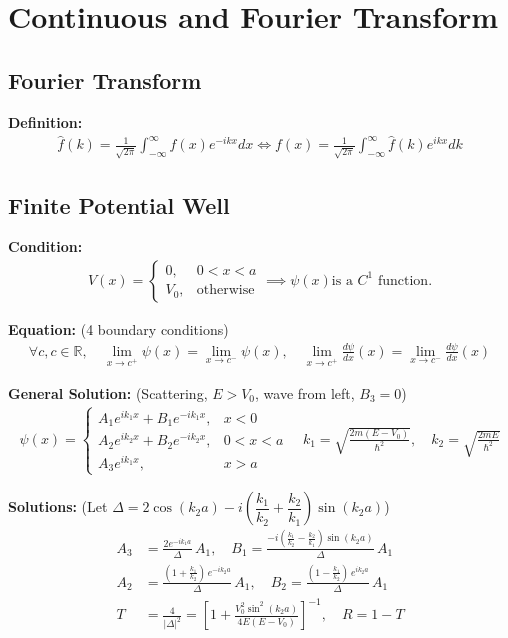 \documentclass[12pt]{article}
\begin{document}
\section{Continuous and Fourier Transform }

\subsection{Fourier Transform } 

\textbf{Definition: }
\begin{align}
    \hat{f}(k) = \frac{1}{\sqrt{2\pi}} \int_{-\infty}^{\infty} f(x) e^{-ikx} dx \Longleftrightarrow f(x) = \frac{1}{\sqrt{2\pi}} \int_{-\infty}^{\infty} \hat{f}(k) e^{ikx} dk 
\end{align} 

\subsection{Finite Potential Well } 

\textbf{Condition: }
\begin{align}
    V(x) = \begin{cases}
    0, & 0 < x < a \\
    V_0, & \text{otherwise}
\end{cases} \implies \psi(x) \text{is a $C^1$ function.} 
\end{align} 

\textbf{Equation: } (4 boundary conditions)
\begin{align}
    \forall c, c \in \mathbb{R}, \quad \lim_{x \to c^+} \psi(x) = \lim_{x \to c^-} \psi(x), \quad \lim_{x \to c^+} \frac{d\psi}{dx}(x) = \lim_{x \to c^-} \frac{d\psi}{dx}(x) 
\end{align} 

\textbf{General Solution: } (Scattering, $E > V_0$, wave from left, $B_3 = 0$)
\begin{align}
    \psi(x) = \begin{cases}
    A_1 e^{ik_1 x} + B_1 e^{-ik_1 x}, & x < 0 \\
    A_2 e^{ik_2 x} + B_2 e^{-ik_2 x}, & 0 < x < a \\
    A_3 e^{ik_1 x}, & x > a
\end{cases} \quad k_1 = \sqrt{\frac{2m(E-V_0)}{\hbar^2}}, \quad k_2 = \sqrt{\frac{2mE}{\hbar^2}}
\end{align}

\textbf{Solutions: } (Let $\Delta = 2\cos(k_2 a) - i\left(\dfrac{k_1}{k_2}+\dfrac{k_2}{k_1}\right)\sin(k_2 a)$)
\begin{align}
    A_3 &= \frac{2e^{-ik_1 a}}{\Delta}\,A_1, \quad
    B_1 = \frac{-i\!\left(\tfrac{k_1}{k_2}-\tfrac{k_2}{k_1}\right)\sin(k_2 a)}{\Delta}\,A_1 \\
    A_2 &= \frac{(1+\tfrac{k_1}{k_2})\,e^{-ik_2 a}}{\Delta}\,A_1, \quad
    B_2 = \frac{(1-\tfrac{k_1}{k_2})\,e^{ik_2 a}}{\Delta}\,A_1 \\
    T &= \frac{4}{|\Delta|^2} = \left[1 + \frac{V_0^2 \sin^2(k_2 a)}{4E(E-V_0)}\right]^{-1}, \quad R = 1 - T
\end{align}
\end{document}
